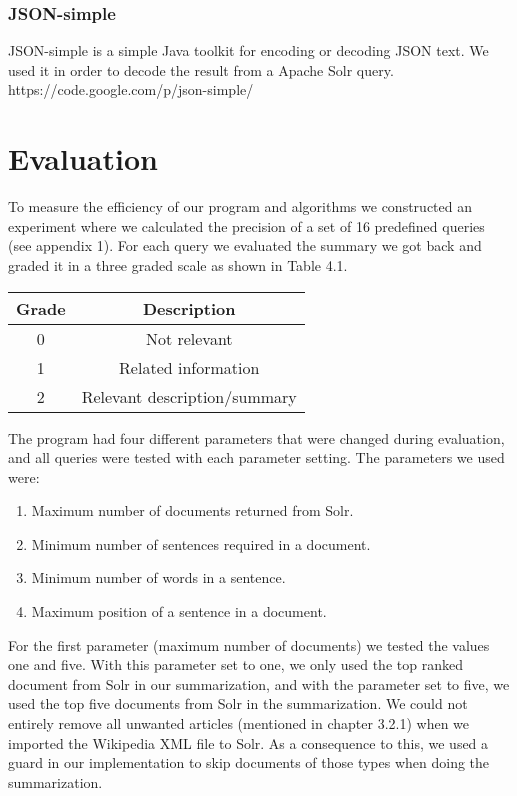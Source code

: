 \documentclass[10pt, a4paper]{article}
\begin{document}
\subsubsection{JSON-simple}
JSON-simple is a simple Java toolkit for encoding or decoding JSON text. We used it in order to decode the result from a Apache Solr query.
https://code.google.com/p/json-simple/

\section{Evaluation}
To measure the efficiency of our program and algorithms we constructed an experiment where we calculated the precision of a set of 16 predefined queries (see appendix 1). For each query we evaluated the summary we got back and graded it in a three graded scale as shown in Table 4.1.

\begin{tabular}[c]{c|c}
Grade & Description \\
\hline
0 & Not relevant \\
1 & Related information \\
2 & Relevant description/summary \\
\end{tabular}

The program had four different parameters that were changed during evaluation, and all queries were tested with each parameter setting. The parameters we used were:
\begin{enumerate}
\item Maximum number of documents returned from Solr.
\item Minimum number of sentences required in a document.
\item Minimum number of words in a sentence.
\item Maximum position of a sentence in a document.
\end{enumerate}

For the first parameter (maximum number of documents) we tested the values one and five. With this parameter set to one, we only used the top ranked document from Solr in our summarization, and with the parameter set to five, we used the top five documents from Solr in the summarization. We could not entirely remove all unwanted articles (mentioned in chapter 3.2.1) when we imported the Wikipedia XML file to Solr. As a consequence to this, we used a guard in our implementation to skip documents of those types when doing the summarization.
\end{document}
